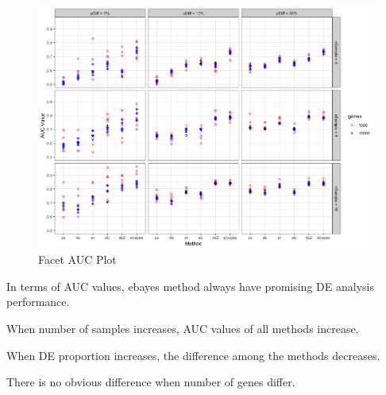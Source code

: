\documentclass[11pt]{isuthesis}
\begin{document}
\begin{figure}[h!tb] 
\includegraphics[scale=0.4]{auc_facet_plot}
\caption{Facet AUC Plot}
\label{auc}
\end{figure}

In terms of AUC values, ebayes method always have promising DE analysis performance.

When number of samples increases, AUC values of all methods increase. 

When DE proportion increases, the difference among the methods decreases. 

There is no obvious difference when number of genes differ.


%
%


\renewcommand{\bibname}{\centerline{BIBLIOGRAPHY}}
\unappendixtitle
\newpage
{}


\end{document}
